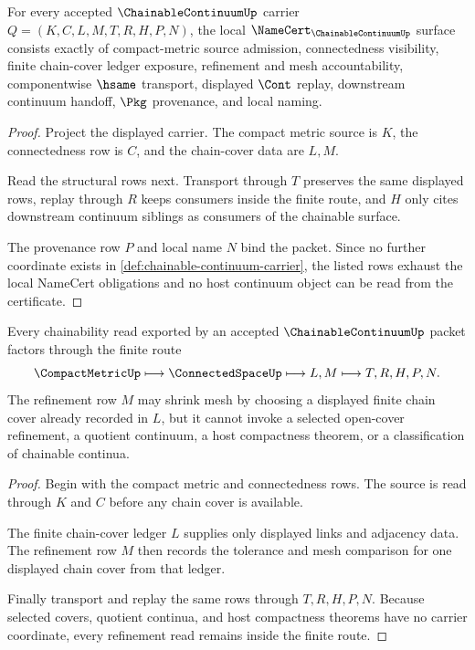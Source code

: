 \begin{theorem}
\label{thm:chainable-continuum-namecert-obligations}
For every accepted $\ChainableContinuumUp$ carrier $Q=(K,C,L,M,T,R,H,P,N)$, the local $\NameCert_{\ChainableContinuumUp}$ surface consists exactly of compact-metric source admission, connectedness visibility, finite chain-cover ledger exposure, refinement and mesh accountability, componentwise $\hsame$ transport, displayed $\Cont$ replay, downstream continuum handoff, $\Pkg$ provenance, and local naming.
\end{theorem}
\begin{proof}
Project the displayed carrier. The compact metric source is $K$, the connectedness row is $C$, and the chain-cover data are $L,M$.

Read the structural rows next. Transport through $T$ preserves the same displayed rows, replay through $R$ keeps consumers inside the finite route, and $H$ only cites downstream continuum siblings as consumers of the chainable surface.

The provenance row $P$ and local name $N$ bind the packet. Since no further coordinate exists in \autoref{def:chainable-continuum-carrier}, the listed rows exhaust the local NameCert obligations and no host continuum object can be read from the certificate.
\end{proof}

\begin{theorem}
\label{thm:chainable-continuum-finite-chain-refinement}
Every chainability read exported by an accepted $\ChainableContinuumUp$ packet factors through the finite route
$$
\CompactMetricUp \longmapsto \ConnectedSpaceUp \longmapsto L,M \longmapsto T,R,H,P,N .
$$
The refinement row $M$ may shrink mesh by choosing a displayed finite chain cover already recorded in $L$, but it cannot invoke a selected open-cover refinement, a quotient continuum, a host compactness theorem, or a classification of chainable continua.
\end{theorem}
\begin{proof}
Begin with the compact metric and connectedness rows. The source is read through $K$ and $C$ before any chain cover is available.

The finite chain-cover ledger $L$ supplies only displayed links and adjacency data. The refinement row $M$ then records the tolerance and mesh comparison for one displayed chain cover from that ledger.

Finally transport and replay the same rows through $T,R,H,P,N$. Because selected covers, quotient continua, and host compactness theorems have no carrier coordinate, every refinement read remains inside the finite route.
\end{proof}

